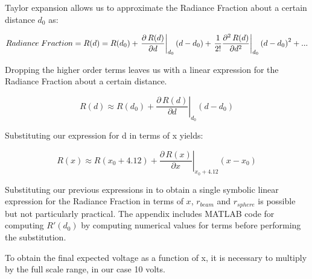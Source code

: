 \documentclass{article}
\theoremstyle{plain}
\theoremstyle{definition}
\theoremstyle{remark}
\begin{document}
Taylor expansion allows us to approximate the Radiance Fraction about a certain distance $d_0$ as:

$$ Radiance \hspace{0.1cm} Fraction = R(d) = R(d_{0}) + \left. \frac{\partial \, R(d)}{\partial d} \right|_{d_{0}} \left( d - d_{0} \right) + \left. \frac{1}{2!} \frac{\partial^2 \, R(d)}{\partial d^2} \right|_{d_{0}} \left(d-d_{0}\right)^2 + ... $$

Dropping the higher order terms leaves us with a linear expression for the Radiance Fraction about a certain distance.

$$ R(d) \approx R(d_{0}) + \left. \frac{\partial \, R(d)}{\partial d} \right|_{d_{0}} \left( d - d_{0} \right) $$

Substituting our expression for d in terms of x yields:

$$ R(x) \approx R(x_{0} + 4.12) + \left. \frac{\partial \, R(x)}{\partial x} \right|_{x_{0}+4.12} \left( x - x_{0} \right) $$

Substituting our previous expressions in to obtain a single symbolic linear expression for the Radiance Fraction in terms of $x$, $r_{beam}$ and $r_{sphere}$ is possible but not particularly practical.  The appendix includes MATLAB code for computing $R'(d_{0})$ by computing numerical values for terms before performing the substitution.

To obtain the final expected voltage as a function of x, it is necessary to multiply by the full scale range, in our case 10 volts.
\end{document}
